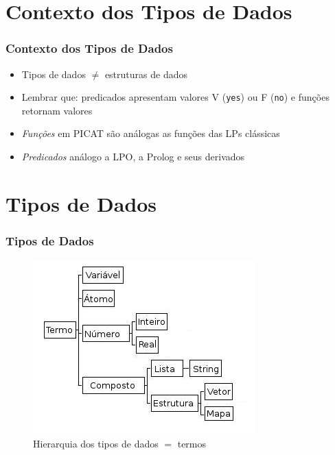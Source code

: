 

\section{Contexto dos Tipos de Dados}

\begin{frame}
\frametitle{Contexto dos Tipos de Dados}

\begin{itemize}
 

  \item Tipos de dados $\neq  $ estruturas de dados

\item Lembrar que: predicados apresentam valores  V (\texttt{yes}) ou F (\texttt{no}) e funções retornam valores

  \item \textit{Funções} em PICAT são análogas as funções das LPs clássicas

  \item \textit{Predicados} análogo a LPO, a Prolog e seus derivados
 \end{itemize}

\end{frame}

\section{Tipos de Dados}

\begin{frame}
\frametitle{Tipos de Dados}

\begin{figure}[!ht]
\centering
\includegraphics[width=.6\textwidth]{figures/tipos_dados_picat_traduzido.jpg}
\caption{Hierarquia dos tipos de dados $=$ termos}
\label{Hiera}
\end{figure}

\end{frame}

